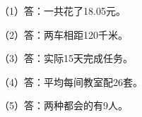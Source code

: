
\begingroup\color{answerred}\noindent（1）答：一共花了18.05元。\par
\noindent（2）答：两车相距120千米。\par
\noindent（3）答：实际15天完成任务。\par
\noindent（4）答：平均每间教室配26套。\par
\noindent（5）答：两种都会的有9人。\par\par\endgroup
